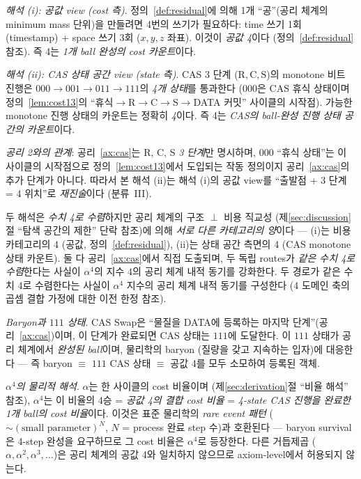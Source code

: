 \documentclass[entropy,article,submit,pdftex,oneauthor]{Definitions/mdpi}
\begin{document}
\emph{해석 (i): 공값 view (cost 측)}. 정의~\ref{def:residual}에 의해 1개 ``공''(공리 체계의 minimum mass 단위)을 만들려면 4번의 쓰기가 필요하다: time 쓰기 1회 (timestamp) + space 쓰기 3회 ($x, y, z$ 좌표). 이것이 \emph{공값 4}이다 (정의~\ref{def:residual} 참조). 즉 4는 \emph{1개 ball 완성의 cost 카운트}이다.

\emph{해석 (ii): CAS 상태 공간 view (state 측)}. CAS 3 단계 ($\mathrm{R}, \mathrm{C}, \mathrm{S}$)의 monotone 비트 진행은 $000 \to 001 \to 011 \to 111$의 \emph{4개 상태}를 통과한다 ($000$은 CAS 휴식 상태이며 정의~\ref{lem:cost13}의 ``휴식$\to$R$\to$C$\to$S$\to$DATA 커밋'' 사이클의 시작점). 가능한 monotone 진행 상태의 카운트는 정확히 \emph{4}이다. 즉 4는 \emph{CAS의 ball-완성 진행 상태 공간의 카운트}이다.

\emph{공리 2와의 관계}: 공리~\ref{ax:cas}는 R, C, S \emph{3 단계}만 명시하며, $000$ ``휴식 상태''는 이 사이클의 시작점으로 정의~\ref{lem:cost13}에서 도입되는 작동 정의이지 공리~\ref{ax:cas}의 추가 단계가 아니다. 따라서 본 해석 (ii)는 해석 (i)의 공값 view를 ``출발점 + 3 단계 = 4 위치''로 \emph{재진술}이다 (분류~III).

두 해석은 \emph{수치 4로 수렴}하지만 공리 체계의 구조 $\perp$ 비용 직교성 (제\ref{sec:discussion}절 ``탐색 공간의 제한'' 단락 참조)에 의해 \emph{서로 다른 카테고리의 양}이다 --- (i)는 비용 카테고리의 4 (공값, 정의~\ref{def:residual}), (ii)는 상태 공간 측면의 4 (CAS monotone 상태 카운트). 둘 다 공리~\ref{ax:cas}에서 직접 도출되며, 두 독립 routes가 \emph{같은 수치 4로 수렴}한다는 사실이 $\alpha^4$의 지수 $4$의 공리 체계 내적 동기를 강화한다. 두 경로가 같은 수치 4로 수렴한다는 사실이 $\alpha^4$ 지수의 공리 체계 내적 동기를 구성한다 (4 도메인 축의 곱셈 결합 가정에 대한 이전 한정 참조).

\emph{Baryon과 $111$ 상태}. CAS Swap은 ``물질을 DATA에 등록하는 마지막 단계''(공리~\ref{ax:cas})이며, 이 단계가 완료되면 CAS 상태는 $111$에 도달한다. 이 $111$ 상태가 공리 체계에서 \emph{완성된 ball}이며, 물리학의 baryon (질량을 갖고 지속하는 입자)에 대응한다 --- 즉 baryon $\equiv$ $111$ CAS 상태 $\equiv$ 공값 4를 모두 소모하여 등록된 객체.

\emph{$\alpha^4$의 물리적 해석}. $\alpha$는 한 사이클의 cost 비율이며 (제\ref{sec:derivation}절 ``비율 해석'' 참조), $\alpha^4$는 이 비율의 4승 = \emph{공값 4의 결합 cost 비율} = \emph{4-state CAS 진행을 완료한 1개 ball의 cost 비율}이다. 이것은 표준 물리학의 \emph{rare event 패턴} ($\sim (\text{small parameter})^N$, $N$ = process 완료 step 수)과 호환된다 --- baryon survival은 4-step 완성을 요구하므로 그 cost 비율은 $\alpha^4$로 등장한다. 다른 거듭제곱 ($\alpha, \alpha^2, \alpha^3, \ldots$)은 공리 체계의 공값 4와 일치하지 않으므로 axiom-level에서 허용되지 않는다.
\end{document}
